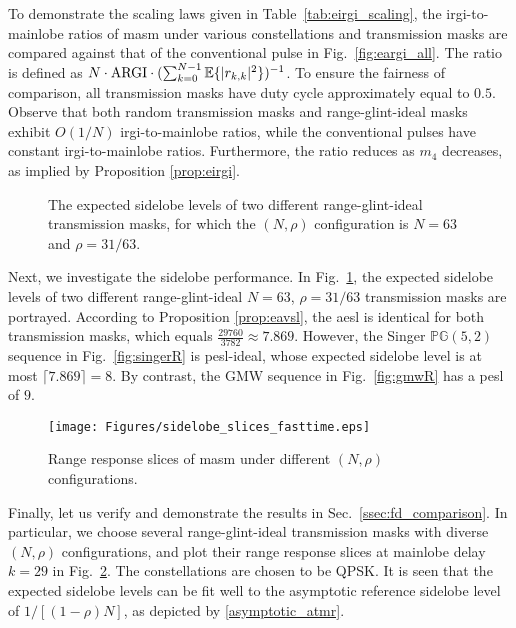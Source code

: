 \documentclass[journal,a4paper,10pt, romanappendices]{IEEEtran}
\begin{document}
To demonstrate the scaling laws given in Table~\ref{tab:eirgi_scaling}, the \ac{irgi}-to-mainlobe ratios of \ac{masm} under various constellations and transmission masks are compared against that of the conventional pulse in Fig.~\ref{fig:eargi_all}. The ratio is defined as $N\cdot {\rm ARGI}\cdot (\sum_{k=0}^{N-1}\mathbb{E}\{|r_{k,k}|^2\})^{-1}$. To ensure the fairness of comparison, all transmission masks have duty cycle approximately equal to $0.5$. Observe that both random transmission masks and range-glint-ideal masks exhibit $O(1/N)$ \ac{irgi}-to-mainlobe ratios, while the conventional pulses have constant \ac{irgi}-to-mainlobe ratios. Furthermore, the ratio reduces as $m_4$ decreases, as implied by Proposition \ref{prop:eirgi}.

\begin{figure}[t]
\vspace{-4mm}
\caption{The expected sidelobe levels of two different range-glint-ideal transmission masks, for which the $(N,\rho)$ configuration is $N=63$ and $\rho=31/63$.}
\label{fig:two_sidelobe_levels}
\vspace{-4mm}
\end{figure}

Next, we investigate the sidelobe performance. In Fig.~\ref{fig:two_sidelobe_levels}, the expected sidelobe levels of two different range-glint-ideal $N=63$, $\rho=31/63$ transmission masks are portrayed. According to Proposition \ref{prop:eavsl}, the \ac{aesl} is identical for both transmission masks, which equals $\frac{29760}{3782}\approx7.869$. However, the Singer $\mathbb{PG}(5,2)$ sequence in Fig.~\ref{fig:singerR} is \ac{pesl}-ideal, whose expected sidelobe level is at most $\lceil 7.869\rceil = 8$. By contrast, the GMW sequence in Fig.~\ref{fig:gmwR} has a \ac{pesl} of $9$.

\begin{figure}[t]
    \centering
    \texttt{[image: Figures/sidelobe\_slices\_fasttime.eps]}
    \caption{Range response slices of \ac{masm} under different $(N,\rho)$ configurations.}
    \label{fig:sidelobe_slices_fasttime}
    \vspace{-4mm}
\end{figure}

Finally, let us verify and demonstrate the results in Sec.~\ref{ssec:fd_comparison}. In particular, we choose several range-glint-ideal transmission masks with diverse $(N,\rho)$ configurations, and plot their range response slices at mainlobe delay $k=29$ in Fig.~\ref{fig:sidelobe_slices_fasttime}. The constellations are chosen to be QPSK. It is seen that the expected sidelobe levels can be fit well to the asymptotic reference sidelobe level of $1/[(1-\rho)N]$, as depicted by \eqref{asymptotic_atmr}.
\end{document}
